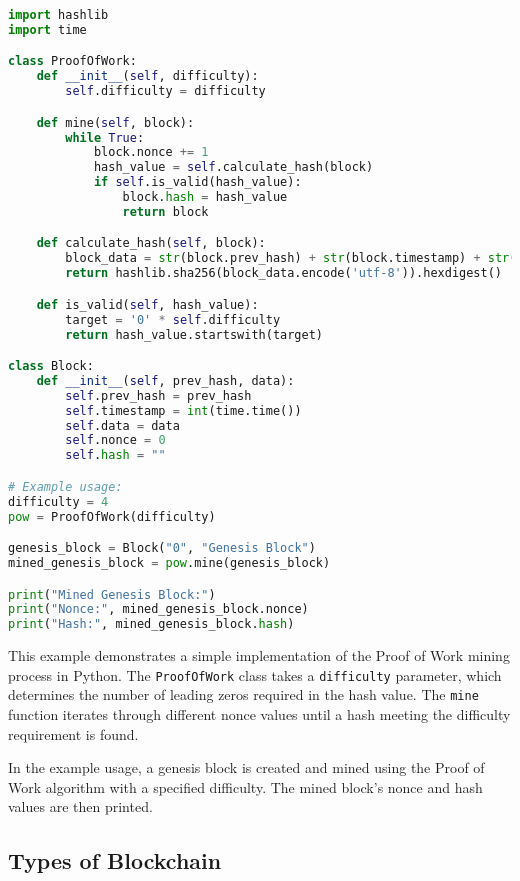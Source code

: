 \begin{lstlisting}[language=Python, caption={Proof of Work Mining Process}, label={lst:pow_mining}]
import hashlib
import time

class ProofOfWork:
    def __init__(self, difficulty):
        self.difficulty = difficulty

    def mine(self, block):
        while True:
            block.nonce += 1
            hash_value = self.calculate_hash(block)
            if self.is_valid(hash_value):
                block.hash = hash_value
                return block

    def calculate_hash(self, block):
        block_data = str(block.prev_hash) + str(block.timestamp) + str(block.data) + str(block.nonce)
        return hashlib.sha256(block_data.encode('utf-8')).hexdigest()

    def is_valid(self, hash_value):
        target = '0' * self.difficulty
        return hash_value.startswith(target)

class Block:
    def __init__(self, prev_hash, data):
        self.prev_hash = prev_hash
        self.timestamp = int(time.time())
        self.data = data
        self.nonce = 0
        self.hash = ""

# Example usage:
difficulty = 4
pow = ProofOfWork(difficulty)

genesis_block = Block("0", "Genesis Block")
mined_genesis_block = pow.mine(genesis_block)

print("Mined Genesis Block:")
print("Nonce:", mined_genesis_block.nonce)
print("Hash:", mined_genesis_block.hash)
\end{lstlisting}

This example demonstrates a simple implementation of the Proof of Work mining process in Python. The \texttt{ProofOfWork} class takes a \texttt{difficulty} parameter, which determines the number of leading zeros required in the hash value. The \texttt{mine} function iterates through different nonce values until a hash meeting the difficulty requirement is found.

In the example usage, a genesis block is created and mined using the Proof of Work algorithm with a specified difficulty. The mined block's nonce and hash values are then printed.

\subsection{Types of Blockchain}
\label{sec:types_of_blockchain}

